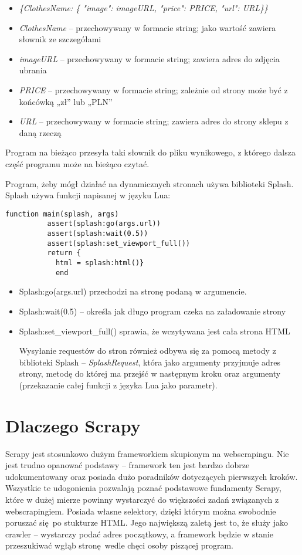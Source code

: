 \begin{itemize}
\item[] \emph{\{ClothesName: \{ "image": imageURL, "price": PRICE, "url": URL\}\}}
\item[] \emph{ClothesName} – przechowywany w formacie string; jako wartość zawiera słownik ze szczegółami
\item[] \emph{imageURL} – przechowywany w formacie string; zawiera adres do zdjęcia ubrania
\item[] \emph{PRICE} – przechowywany w formacie string; zależnie od strony może być z końcówką „zł” lub „PLN”
\item[] \emph{URL} – przechowywany w formacie string; zawiera adres do strony sklepu z daną rzeczą
\end{itemize}
Program na bieżąco przesyła taki słownik do pliku wynikowego, z którego dalsza część programu może na bieżąco czytać.


Program, żeby mógł działać na dynamicznych stronach używa biblioteki Splash.
Splash używa funkcji napisanej w języku Lua:
\begin{lstlisting}
function main(splash, args)
          assert(splash:go(args.url))
          assert(splash:wait(0.5))
          assert(splash:set_viewport_full())
          return {
            html = splash:html()}
            end
\end{lstlisting}
\begin{itemize}
\item[] Splash:go(args.url) przechodzi na stronę podaną w argumencie.
\item[] Splash:wait(0.5) – określa jak długo program czeka na załadowanie strony
\item[] Splash:set\_viewport\_full() sprawia, że wczytywana jest cała strona HTML

Wysyłanie requestów do stron również odbywa się za pomocą metody z biblioteki Splash -- \emph{SplashRequest}, która jako argumenty przyjmuje adres strony, metodę do której ma przejść w następnym kroku oraz argumenty (przekazanie całej funkcji z języka Lua jako parametr).
\end{itemize}
\section{Dlaczego Scrapy}

Scrapy jest stosunkowo dużym frameworkiem skupionym na webscrapingu. Nie jest trudno opanować podstawy -- framework ten jest bardzo dobrze udokumentowany oraz posiada dużo poradników dotyczących pierwszych kroków. Wszystkie te udogonienia pozwalają poznać podstawowe fundamenty Scrapy, które w dużej mierze powinny wystarczyć do większości zadań związanych z webscrapingiem. Posiada własne selektory, dzięki którym można swobodnie poruszać się po stukturze HTML. Jego największą zaletą jest to, że służy jako crawler -- wystarczy podać adres początkowy, a framework będzie w stanie przeszukiwać wgłąb stronę wedle chęci osoby piszącej program.

